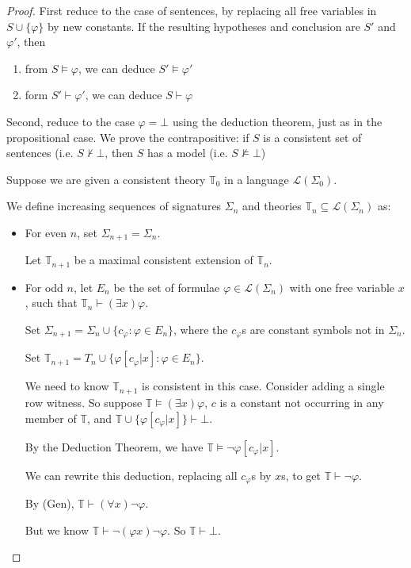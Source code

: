 \documentclass[a4paper]{article}
\theoremstyle{definition}
\newcommand{\T}{\mathbb{T}}
\newcommand{\La}{\mathcal{L}}
\begin{document}
\begin{proof}
  First reduce to the case of sentences, by replacing all free variables in $S\cup \{\varphi\}$ by new constants. If the resulting hypotheses and conclusion are $S'$ and $\varphi'$, then
  \begin{enumerate}
  \item from $S\models \varphi$, we can deduce $S'\models \varphi'$
  \item form $S'\vdash \varphi'$, we can deduce $S\vdash \varphi$
  \end{enumerate}

  Second, reduce to the case $\varphi = \bot$ using the deduction theorem, just as in the propositional case. We prove the contrapositive: if $S$ is a consistent set of sentences (i.e. $S\not\vdash \bot$, then $S$ has a model (i.e. $S\not\models \bot$)

  Suppose we are given a consistent theory $\T_0$ in a language $\La(\Sigma_0)$.

  We define increasing sequences of signatures $\Sigma_n$ and theories $\T_n\subseteq \La(\Sigma_n)$ as:
  \begin{itemize}
  \item For even $n$, set $\Sigma_{n + 1} = \Sigma_n$.

    Let $\T_{n + 1}$ be a maximal consistent extension of $\T_n$.
  \item For odd $n$, let $E_n$ be the set of formulae $\varphi\in \La(\Sigma_n)$ with one free variable $x$, such that $\T_n\vdash (\exists x)\varphi$.

    Set $\Sigma_{n +1} = \Sigma_{n}\cup \{c_\varphi: \varphi\in E_n\}$, where the $c_\varphi$s are constant symbols not in $\Sigma_n$.

    Set $\T_{n + 1} = T_{n}\cup \{\varphi[c_\varphi|x]: \varphi\in E_n\}$.

    We need to know $\T_{n + 1}$ is consistent in this case. Consider adding a single row witness. So suppose $\T \models (\exists x)\varphi$, $c$ is a constant not occurring in any member of $\T$, and $\T\cup \{\varphi[c_\varphi | x]\}\vdash \bot$.

    By the Deduction Theorem, we have $\T\models \neg\varphi[c_\varphi|x]$.

    We can rewrite this deduction, replacing all $c_\varphi$s by $x$s, to get $\T \vdash \neg \varphi$.

    By (Gen), $\T \vdash (\forall x)\neg \varphi$.

    But we know $\T \vdash \neg (\varphi x)\neg \varphi$. So $\T \vdash \bot$.


\end{itemize}
\end{proof}
\end{document}
